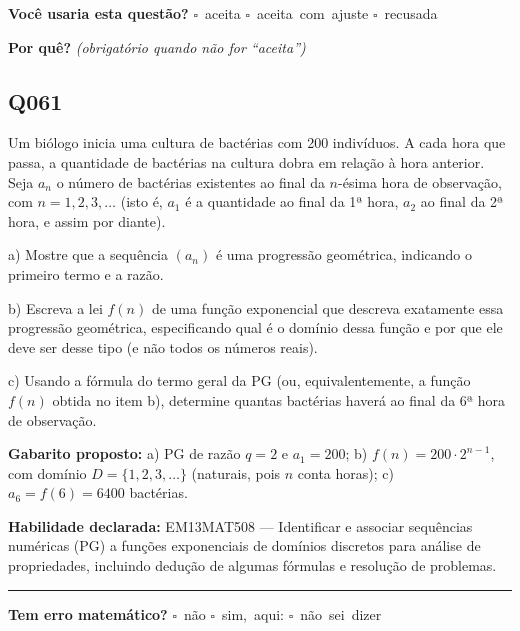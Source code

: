 \documentclass[11pt,a4paper]{article}
\begin{document}
\textbf{Você usaria esta questão?}\quad
\mbox{$\square$~aceita} \quad \mbox{$\square$~aceita com ajuste} \quad
\mbox{$\square$~recusada}

\textbf{Por quê?} \emph{(obrigatório quando não for ``aceita'')}

\underline{\hspace{\linewidth}}

\underline{\hspace{\linewidth}}
\vspace{0.6em}

\begin{samepage}
\subsection*{Q061}
Um biólogo inicia uma cultura de bactérias com 200 indivíduos. A cada hora que passa, a quantidade de bactérias na cultura dobra em relação à hora anterior. Seja $a_n$ o número de bactérias existentes ao final da $n$-ésima hora de observação, com $n = 1, 2, 3, \dots$ (isto é, $a_1$ é a quantidade ao final da 1ª hora, $a_2$ ao final da 2ª hora, e assim por diante).

a) Mostre que a sequência $(a_n)$ é uma progressão geométrica, indicando o primeiro termo e a razão.

b) Escreva a lei $f(n)$ de uma função exponencial que descreva exatamente essa progressão geométrica, especificando qual é o domínio dessa função e por que ele deve ser desse tipo (e não todos os números reais).

c) Usando a fórmula do termo geral da PG (ou, equivalentemente, a função $f(n)$ obtida no item b), determine quantas bactérias haverá ao final da 6ª hora de observação.

\textbf{Gabarito proposto:} a) PG de razão $q=2$ e $a_1=200$; b) $f(n)=200\cdot 2^{n-1}$, com domínio $D=\{1,2,3,\dots\}$ (naturais, pois $n$ conta horas); c) $a_6 = f(6) = 6400$ bactérias.

\textbf{Habilidade declarada:} EM13MAT508 --- Identificar e associar sequências numéricas (PG) a funções exponenciais de domínios discretos para análise de propriedades, incluindo dedução de algumas fórmulas e resolução de problemas.
\end{samepage}

\noindent\rule{\linewidth}{0.4pt}
\textbf{Tem erro matemático?}\quad
\mbox{$\square$~não} \quad \mbox{$\square$~sim, aqui:} \underline{\hspace{5cm}}
\quad \mbox{$\square$~não sei dizer}
\end{document}
